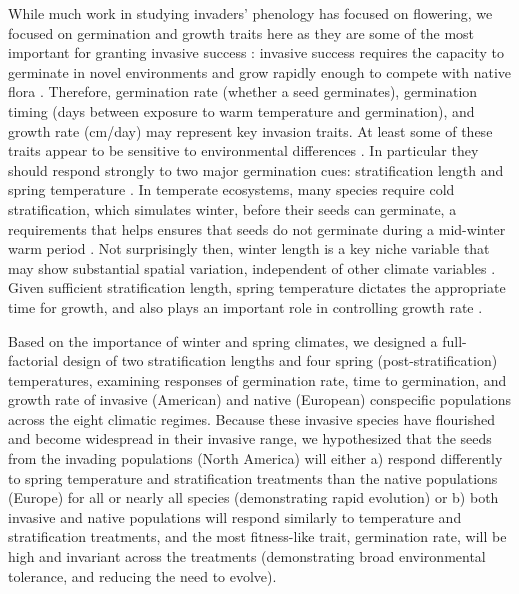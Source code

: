 \documentclass[11pt]{article}\usepackage[]{graphicx}\usepackage[]{color}
\begin{document}
While much work in studying invaders' phenology has focused on flowering, we focused on germination and growth traits here as they are some of the most important for granting invasive success \parencite{Sattin1997, Maillet2000}: invasive success requires the capacity to germinate in novel environments and grow rapidly enough to compete with native flora \parencite{Grime1988, Gioria2017}. Therefore, germination rate (whether a seed germinates), germination timing (days between exposure to warm temperature and germination), and growth rate (cm/day) may represent key invasion traits. At least some of these traits appear to be sensitive to environmental differences \parencite{Leger2007}.  In particular they should respond strongly to two major germination cues: stratification length and spring temperature \parencite{Finch2006}. In temperate ecosystems, many species require cold stratification, which simulates winter, before their seeds can germinate, a requirements that helps ensures that seeds do not germinate during a mid-winter warm period \parencite{Baskin1998,Popay1970,Wulff1994}. Not surprisingly then, winter length is a key niche variable \parencite{Harte2015} that may show substantial spatial variation, independent of other climate variables \parencite{Bonan2003}. Given sufficient stratification length, spring temperature dictates the appropriate time for growth, and also plays an important role in controlling growth rate \parencite{Egli1980,Guilioni2003}. 

Based on the importance of winter and spring climates, we designed a full-factorial design of two stratification lengths and four spring (post-stratification) temperatures, examining responses of germination rate, time to germination, and growth rate of invasive (American) and native (European) conspecific populations across the eight climatic regimes. Because these invasive species have flourished and become widespread in their invasive range, we hypothesized that the seeds from the invading populations (North America) will either a) respond differently to spring temperature and stratification treatments than the native populations (Europe) for all or nearly all species (demonstrating rapid evolution) or b) both invasive and native populations will respond similarly to temperature and stratification treatments, and the most fitness-like trait, germination rate, will be high and invariant across the treatments (demonstrating broad environmental tolerance, and reducing the need to evolve). %
\end{document}
